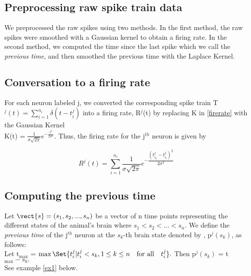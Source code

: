 \subsection{Preprocessing raw spike train data}
We preprocessed the raw spikes using two methods.
In the first method, the raw spikes were smoothed with a Gaussian kernel to obtain a firing rate. In the second method, we computed the time since the last spike which we call the \textit{previous time}, and then smoothed the previous time with the Laplace Kernel.\\


\subsection{Conversation to a firing rate}
For each neuron labeled j,  we converted the corresponding spike train 
T$^{j}(t) = \displaystyle \sum_{i=1}^{n_{i}} \delta(t-t_{i}^{j}) $ into a firing rate,
 R$^{j}$(t) by replacing K in \eqref{firerate} with the  Gaussian Kernel\\
 K(t) =  $\displaystyle \frac{1}{\sigma \sqrt{2\pi}} e^{-\frac{t^2}{2\sigma^2}} $.
Thus, the firing rate for the j$^{th}$ neuron is given by

\begin{equation} \label{jfirerate}
R^{j}(t) = \sum_{i=1}^{n_{i}}  \frac{1}{\sigma \sqrt{2\pi}} 
e^{-\dfrac{(t_{i_{k}}^{j}  - t_{i_{l}}^{j})^2}{2\sigma^2}} 
\end{equation}

\subsection{Computing the previous time}
Let $\vect{s} = (s_1, s_2, ..., s_n)$  be a vector of n time points representing the different states of the animal's brain  where  $s_1 < s_2 < ... < s_n$. We  define the \textit{previous time} of the j$^{th}$ neuron at the $s_{k}$-th brain state  denoted by , p$^{j}(s_{k})$, as follows:\\
Let t$_{\max}$ = $\max  \Set{ t^{j}_{i} | t^{j}_{i} < s_{k},
1 \leq k \leq n \quad \text{for all} \quad  t^{j}_{i} }.$ Then p$^{j}(s_{k})$ = t$_{\max} - s_{k}.$\\
See example  \eqref{ex1} below.




